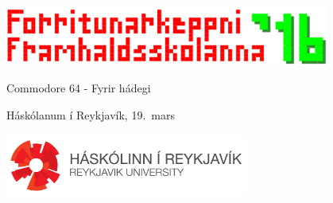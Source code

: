 \documentclass[12pt,a4paper]{problemset}
\begin{document}
\begin{titlepage}
    \centering
    \includegraphics[width=0.8\textwidth]{fklogo}\\
    \vspace{1cm}
    {\Huge Commodore 64 - Fyrir hádegi \par}
    \vspace{0.5cm}
    {\LARGE Háskólanum í Reykjavík, 19.\ mars \par}
    \vspace{2cm}
    { \Huge \tableofcontents }
    \vfill
    \includegraphics[width=0.6\textwidth]{horizontal_white.png}
\end{titlepage}

\end{document}
